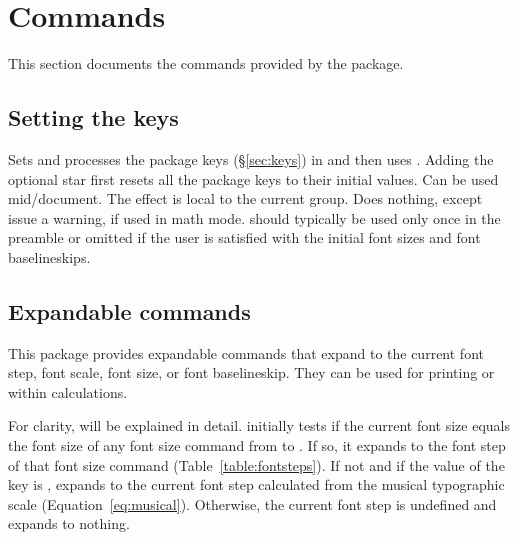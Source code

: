 \documentclass{beery}
\begin{document}
\section{Commands}
\label{sec:commands}

This section documents the commands provided by the  package.

\subsection{Setting the keys}
\label{subsec:fontscalesetup}

 \sarg{} 
\KeepNextPar*

Sets and processes the  package keys (\S\ref{sec:keys}) in  and then uses .
Adding the optional star first resets all the  package keys to their initial values.
Can be used mid\-/document.
The effect is local to the current group.
Does nothing, except issue a warning, if used in math mode.
 should typically be used only once in the preamble or omitted if the user is satisfied with the initial font sizes and font baselineskips.

\subsection{Expandable commands}
\label{subsec:expandable}

\nopagebreak\newline
{}
\newline
{}
\nopagebreak\newline
{}

This package provides expandable commands that expand to the current font step, font scale, font size, or font baselineskip.
They can be used for printing or within calculations.

For clarity,  will be explained in detail.
 initially tests if the current font size equals the font size of any font size command from  to .
If so, it expands to the font step of that font size command (Table~\ref{table:fontsteps}).
If not and if the value of the key  is ,  expands to the current font step calculated from the musical typographic scale (Equation~\ref{eq:musical}).
Otherwise, the current font step is undefined and  expands to nothing.
\end{document}
